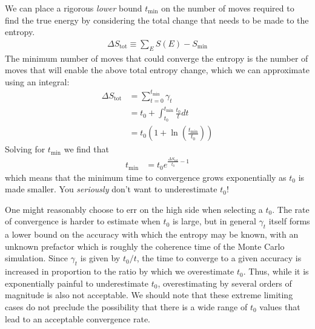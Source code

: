 \documentclass[letterpaper,twocolumn,amsmath,amssymb,pre,aps,10pt]{revtex4-1}
\begin{document}
We can place a rigorous \emph{lower} bound $t_{\min}$ on the number of
moves required to find the true energy by considering the total change
that needs to be made to the entropy.
\begin{align}
  \Delta S_{\text{tot}} \equiv \sum_E S(E) - S_{\min}
\end{align}
The minimum number of moves that could converge the entropy is
the number of moves that will enable the above total entropy change,
which we can approximate using an integral:
\begin{align}
   \Delta S_{\text{tot}} &= \sum_{t=0}^{t_{\min}} \gamma_t \\
  &= t_0 + \int_{t_0}^{t_{\min}} \frac{t_0}{t}dt
  \\
  &= t_0\left(1 + \ln\left(\frac{t_{\min}}{t_0}\right)\right)
\end{align}
Solving for ${t_{\min}}$ we find that
\begin{align}
  {t_{\min}} &= t_0 e^{\frac{\Delta S_{\text{tot}}}{t_0} - 1}
\end{align}
which means that the minimum time to convergence grows exponentially
as $t_0$ is made smaller.  You \emph{seriously} don't want to underestimate
$t_0$!

One might reasonably choose to err on the high side when selecting a $t_0$.
The rate of convergence is harder to estimate when $t_0$ is large, but
in general $\gamma_t$ itself forms a lower bound on the accuracy with which
the entropy may be known, with an unknown prefactor which is roughly
the coherence time of the Monte Carlo simulation.  Since $\gamma_t$ is
given by $t_0/t$, the time to converge to a given accuracy is increased
in proportion to the ratio by which we overestimate $t_0$.  Thus, while
it is exponentially painful to underestimate $t_0$, overestimating by
several orders of magnitude is also not acceptable.  We should note
that these extreme limiting cases do not preclude the possibility that there
is a wide range of $t_0$ values that lead to an acceptable convergence
rate.
\end{document}
